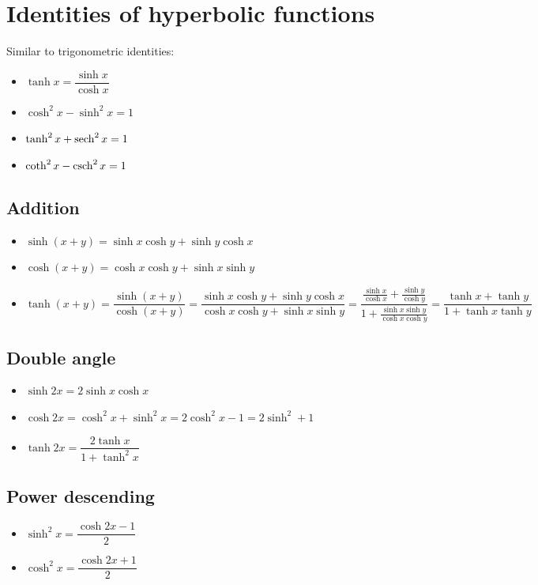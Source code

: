 \section{Identities of hyperbolic functions}
Similar to trigonometric identities:
\begin{itemize}
    \item $\tanh x = \dfrac{\sinh x}{\cosh x}$
    \item $\cosh^2 x - \sinh^2 x = 1$
    \item $\tanh^2 x + \operatorname{sech}^2 x= 1$
    \item $\coth^2 x - \operatorname{csch}^2 x = 1$
\end{itemize}

\subsection{Addition}
\begin{itemize}
    \item $\sinh(x+y)=\sinh x \cosh y + \sinh y \cosh x$
    \item $\cosh(x+y)=\cosh x \cosh y + \sinh x \sinh y$
    \item $\tanh(x+y) = \dfrac{\sinh(x+y)}{\cosh(x+y)} = \dfrac{\sinh x \cosh y + \sinh y \cosh x}{\cosh x \cosh y + \sinh x \sinh y} = \dfrac{\frac{\sinh x}{\cosh x}+\frac{\sinh y}{\cosh y}}{1 + \frac{\sinh x \sinh y}{\cosh x \cosh y}}=\dfrac{\tanh x + \tanh y}{1 + \tanh x \tanh y}$
\end{itemize}

\subsection{Double angle}
\begin{itemize}
    \item $\sinh 2x = 2\sinh x \cosh x$
    \item $\cosh 2x = \cosh^2 x + \sinh^2 x = 2\cosh^2 x - 1 = 2\sinh^2 + 1$
    \item $\tanh 2x = \dfrac{2\tanh x}{1 + \tanh^2 x}$
\end{itemize}

\subsection{Power descending}
\begin{itemize}
    \item $\sinh^2 x = \dfrac{\cosh 2x - 1}{2}$
    \item $\cosh^2 x = \dfrac{\cosh 2x + 1}{2}$
\end{itemize}


